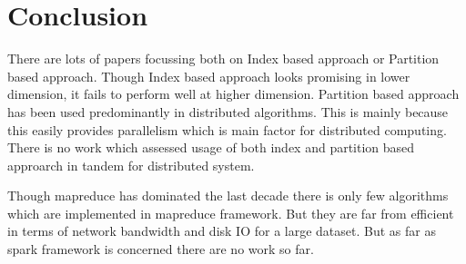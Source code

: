 \documentclass[conference]{IEEEtran}
\begin{document}

\bigskip

\section{Conclusion}

There are lots of papers focussing both on Index based approach or
Partition based approach. Though Index based approach looks promising
in lower dimension, it fails to perform well
at higher dimension. Partition based approach has been used
predominantly in distributed algorithms. This is mainly because this
easily provides parallelism which is main factor for distributed
computing. There is no work which assessed usage of both index and
partition based approarch in tandem for distributed system.

\bigskip

Though mapreduce has dominated the last decade there is only few algorithms which are implemented in mapreduce
framework. But they are far from efficient in terms of network
bandwidth and disk IO for a large dataset. But as far as spark
framework is concerned there are no work so far.

\bigskip


\newpage



%






\end{document}
